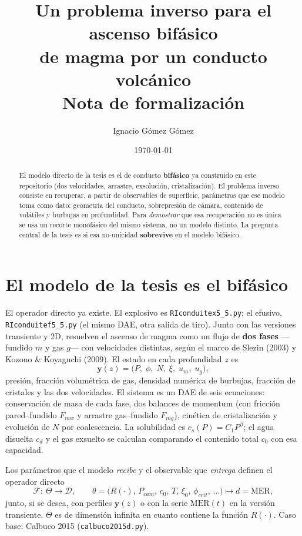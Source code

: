 \documentclass[11pt,a4paper]{article}
\title{\vspace{-1.5cm}\textbf{Un problema inverso para el ascenso bifásico\\ de magma por un conducto volcánico}\\[0.3em]
\large Nota de formalización}
\author{Ignacio Gómez Gómez}
\date{\today}
\theoremstyle{plain}
\theoremstyle{definition}
\theoremstyle{remark}
\newcommand{\MER}{\mathrm{MER}}
\begin{document}
\maketitle
\vspace{-0.8cm}

\begin{abstract}\noindent
El modelo directo de la tesis es el de conducto \textbf{bifásico} ya
construido en este repositorio (dos velocidades, arrastre, exsolución,
cristalización). El problema inverso consiste en recuperar, a partir de
observables de superficie, parámetros que ese modelo toma como dato: geometría
del conducto, sobrepresión de cámara, contenido de volátiles y burbujas en
profundidad. Para \emph{demostrar} que esa recuperación no es única se usa un
recorte monofásico del mismo sistema, no un modelo distinto. La pregunta
central de la tesis es si esa no-unicidad \textbf{sobrevive} en el modelo
bifásico.
\end{abstract}

\section{El modelo de la tesis es el bifásico}

El operador directo ya existe. El explosivo es \texttt{RIconduitex5\_5.py};
el efusivo, \texttt{RIconduitef5\_5.py} (el mismo DAE, otra salida de tiro).
Junto con las versiones transiente y 2D, resuelven el ascenso de magma como un flujo de
\textbf{dos fases} ---fundido $m$ y gas $g$--- con velocidades distintas, según
el marco de Slezin (2003) y Kozono \& Koyaguchi (2009). El estado en cada
profundidad $z$ es
\begin{equation}
\mathbf{y}(z)=\bigl(P,\;\phi,\;N,\;\xi,\;u_m,\;u_g\bigr),
\end{equation}
presión, fracción volumétrica de gas, densidad numérica de burbujas, fracción
de cristales y las dos velocidades. El sistema es un DAE de seis ecuaciones:
conservación de masa de cada fase, dos balances de momentum (con fricción
pared--fundido $F_{mw}$ y arrastre gas--fundido $F_{mg}$), cinética de
cristalización y evolución de $N$ por coalescencia. La solubilidad es
$c_s(P)=C_1 P^\beta$; el agua disuelta $c_d$ y el gas exsuelto se calculan
comparando el contenido total $c_0$ con esa capacidad.

Los parámetros que el modelo \emph{recibe} y el observable que \emph{entrega}
definen el operador directo
\begin{equation}
\mathcal{F}:\ \Theta\longrightarrow\mathcal{D},\qquad
\theta=\bigl(R(\cdot),\,P_{cam},\,c_0,\,T,\,\xi_0,\,\phi_{crit},\,\ldots\bigr)
\longmapsto d=\MER,
\end{equation}
junto, si se desea, con perfiles $\mathbf{y}(z)$ o con la serie $\MER(t)$ en
la versión transiente. $\Theta$ es de dimensión infinita en cuanto contiene
la función $R(\cdot)$. Caso base: Calbuco 2015
(\texttt{calbuco2015d.py}).
\end{document}
